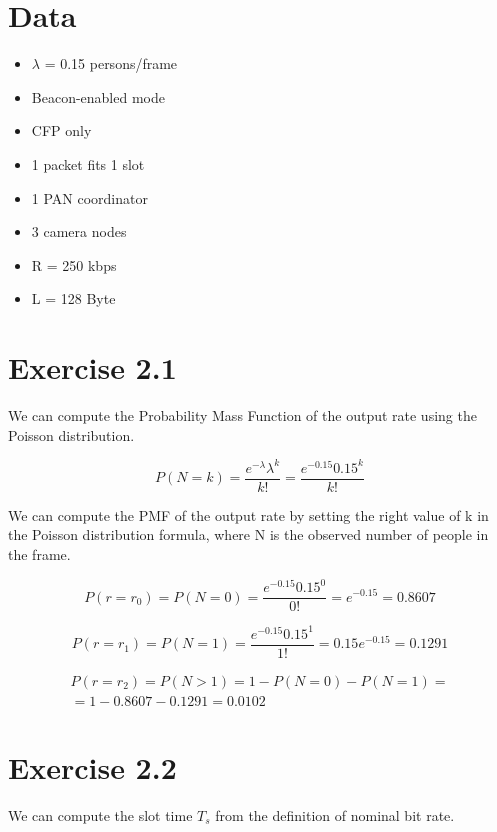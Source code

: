 \section{Data}
\begin{itemize}
\item $\lambda$ = 0.15 persons/frame
\item Beacon-enabled mode
\item CFP only
\item 1 packet fits 1 slot
\item 1 PAN coordinator
\item 3 camera nodes
\item R = 250 kbps
\item L = 128 Byte
\end{itemize}

\section{Exercise 2.1}
We can compute the Probability Mass Function of the output rate using the Poisson distribution.

\begin{equation}
P(N = k) = \frac{e^{-\lambda} \lambda^k}{k!} = \frac{e^{-0.15} 0.15^k}{k!}
\end{equation}

We can compute the PMF of the output rate by setting the right value of k in the Poisson distribution formula, where N is the observed number of people in the frame.

\begin{equation}
P(r = r_0) = P(N = 0) = \frac{e^{-0.15} 0.15^0}{0!} = e^{-0.15} = 0.8607
\end{equation}

\begin{equation}
P(r = r_1) = P(N = 1) = \frac{e^{-0.15} 0.15^1}{1!} = 0.15 e^{-0.15} = 0.1291
\end{equation}

\begin{equation}
\begin{split}
	P(r = r_2) = P(N > 1) = 1 - P(N = 0) - P(N = 1) = \\
	= 1- 0.8607 - 0.1291 = 0.0102
\end{split}
\end{equation}

\section{Exercise 2.2}
We can compute the slot time $T_{s}$ from the definition of nominal bit rate.

